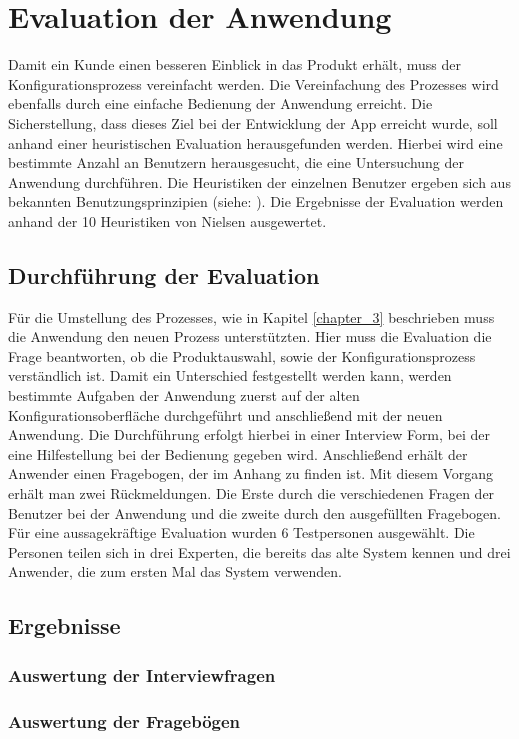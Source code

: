\chapter{Evaluation der Anwendung}\label{chapter_6}
Damit ein Kunde einen besseren Einblick in das Produkt erhält, muss der Konfigurationsprozess vereinfacht werden. Die Vereinfachung des Prozesses wird ebenfalls durch eine einfache Bedienung der Anwendung erreicht. Die Sicherstellung, dass dieses Ziel bei der Entwicklung der App erreicht wurde, soll anhand einer heuristischen Evaluation herausgefunden werden. Hierbei wird eine bestimmte Anzahl an Benutzern herausgesucht, die eine Untersuchung der Anwendung durchführen. Die Heuristiken der einzelnen Benutzer ergeben sich aus bekannten Benutzungsprinzipien (siehe: \cite{bib:heuristik1}). Die Ergebnisse der Evaluation werden anhand der 10 Heuristiken von Nielsen \cite{bib:heuristik2} ausgewertet.


\section{Durchführung der Evaluation}
Für die Umstellung des Prozesses, wie in Kapitel \ref{chapter_3} beschrieben muss die Anwendung den neuen Prozess unterstützten. Hier muss die Evaluation die Frage beantworten, ob die Produktauswahl, sowie der Konfigurationsprozess verständlich ist. Damit ein Unterschied festgestellt werden kann, werden bestimmte Aufgaben der Anwendung zuerst auf der alten Konfigurationsoberfläche durchgeführt und anschließend mit der neuen Anwendung. Die Durchführung erfolgt hierbei in einer Interview Form, bei der eine Hilfestellung bei der Bedienung gegeben wird. Anschließend erhält der Anwender einen Fragebogen, der im Anhang zu finden ist. Mit diesem Vorgang erhält man zwei Rückmeldungen. Die Erste durch die verschiedenen Fragen der Benutzer bei der Anwendung und die zweite durch den ausgefüllten Fragebogen. Für eine aussagekräftige Evaluation wurden 6 Testpersonen ausgewählt. Die Personen teilen sich in drei Experten, die bereits das alte System kennen und drei Anwender, die zum ersten Mal das System verwenden.


\section{Ergebnisse}

\subsection{Auswertung der Interviewfragen}

\subsection{Auswertung der Fragebögen}
